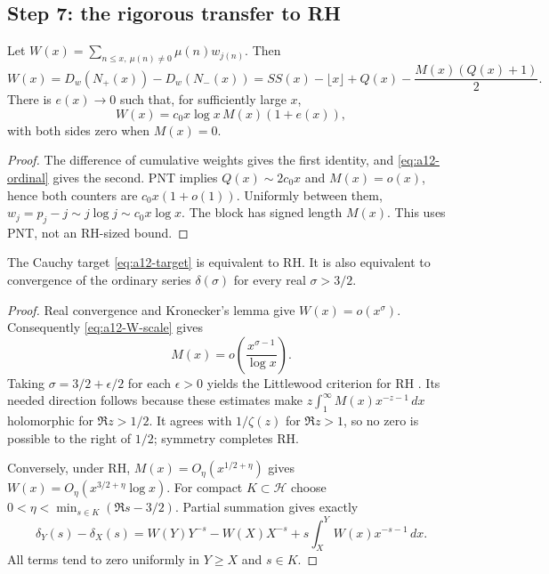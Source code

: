 \subsection{Step 7: the rigorous transfer to RH}
\label{subsec:a12-transfer}
\begin{proposition}
\label{prop:a12-W-scale}
Let $W(x)=\sum_{n\le x,\ \mu(n)\ne0}\mu(n)w_{j(n)}$. Then
\begin{equation}
\label{eq:a12-W}
W(x)=D_w(N_+(x))-D_w(N_-(x))
=SS(x)-\lfloor x\rfloor+Q(x)-\frac{M(x)(Q(x)+1)}2.
\end{equation}
There is $e(x)\to0$ such that, for sufficiently large $x$,
\begin{equation}
\label{eq:a12-W-scale}
W(x)=c_0x\log x\,M(x)(1+e(x)),
\end{equation}
with both sides zero when $M(x)=0$.
\end{proposition}
\begin{proof}
The difference of cumulative weights gives the first identity, and
\eqref{eq:a12-ordinal} gives the second. PNT implies $Q(x)\sim2c_0x$ and
$M(x)=o(x)$, hence both counters are $c_0x(1+o(1))$.
Uniformly between them, $w_j=p_j-j\sim j\log j\sim c_0x\log x$.
The block has signed length $M(x)$. This uses PNT, not an RH-sized bound.
\end{proof}

\begin{theorem}
\label{thm:a12-transfer}
The Cauchy target \eqref{eq:a12-target} is equivalent to RH.
It is also equivalent to convergence of the ordinary series $\delta(\sigma)$
for every real $\sigma>3/2$.
\end{theorem}
\begin{proof}
Real convergence and Kronecker's lemma give $W(x)=o(x^\sigma)$.
Consequently \eqref{eq:a12-W-scale} gives
\begin{equation}
\label{eq:a12-Kronecker}
M(x)=o\left(\frac{x^{\sigma-1}}{\log x}\right).
\end{equation}
Taking $\sigma=3/2+\epsilon/2$ for each $\epsilon>0$ yields the
Littlewood criterion for RH \cite{Littlewood1912,Titchmarsh1986}.
Its needed direction follows because these estimates make
$z\int_1^\infty M(x)x^{-z-1}\,dx$ holomorphic for $\Re z>1/2$.
It agrees with $1/\zeta(z)$ for $\Re z>1$, so no zero is possible to
the right of $1/2$; symmetry completes RH.

Conversely, under RH, $M(x)=O_\eta(x^{1/2+\eta})$ gives
$W(x)=O_\eta(x^{3/2+\eta}\log x)$.
For compact $K\subset\mathcal H$ choose
$0<\eta<\min_{s\in K}(\Re s-3/2)$. Partial summation gives exactly
\begin{equation}
\label{eq:a12-Abel-tail}
\delta_Y(s)-\delta_X(s)
=W(Y)Y^{-s}-W(X)X^{-s}
+s\int_X^Y W(x)x^{-s-1}\,dx.
\end{equation}
All terms tend to zero uniformly in $Y\ge X$ and $s\in K$.
\end{proof}

